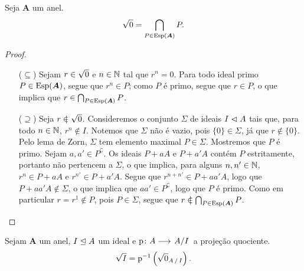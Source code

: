 \begin{proposition}
Seja $\bm A$ um anel.
	\begin{equation*}
	\sqrt{0} = \bigcap_{P \in \operatorname{Esp}(\bm A)} P.
	\end{equation*}
\end{proposition}
\begin{proof}
	\begin{itemize}
	\item [($\subseteq$)] Sejam $r \in \sqrt{0}$ e $n \in \mathbb{N}$ tal que $r^n=0$. Para todo ideal primo $P \in \operatorname{Esp}(\bm A)$, segue que $r^n \in P$; como $P$ é primo, segue que $r \in P$, o que implica que $r \in \bigcap_{P \in \operatorname{Esp}(\bm A)} P$.
	
	\item [($\supseteq$)] Seja $r \notin \rad{0}$. Consideremos o conjunto $\Sigma$ de ideais $I \mathrel{\lhd} A$ tais que, para todo $n \in \mathbb{N}$, $r^n \notin I$. Notemos que $\Sigma$ não é vazio, pois $\{0\} \in \Sigma$, já que $r \notin \{0\}$. Pelo lema de Zorn, $\Sigma$ tem elemento maximal $P \in \Sigma$. Mostremos que $P$ é primo. Sejam $a,a' \in P^ \complement$. Os ideais $P+aA$ e $P+a'A$ contém $P$ estritamente, portanto não pertencem a $\Sigma$, o que implica, para alguns $n,n' \in \mathbb{N}$, $r^n \in P+aA$ e $r^{n'} \in P+a'A$. Segue que $r^{n+n'} \in P + aa'A$, logo que $P+aa'A \notin \Sigma$, o que implica que $aa' \in P^\complement$, logo que $P$ é primo. Como em particular $r =r^1\notin P$, pois $P \in \Sigma$, segue que $r \notin \bigcap_{P \in \Esp(\bm A)} P$.
	\end{itemize}
\end{proof}

\begin{exercise}
Sejam $\bm A$ um anel, $I \mathrel{\unlhd} A$ um ideal e $\fun{\proj}{A}{\quo{A}{I}}$ a projeção quociente.
	\begin{equation*}
	\rad{I} = \proj\inv \left( \rad{0}_{\quo{A}{I}} \right).
	\end{equation*}
\end{exercise}

